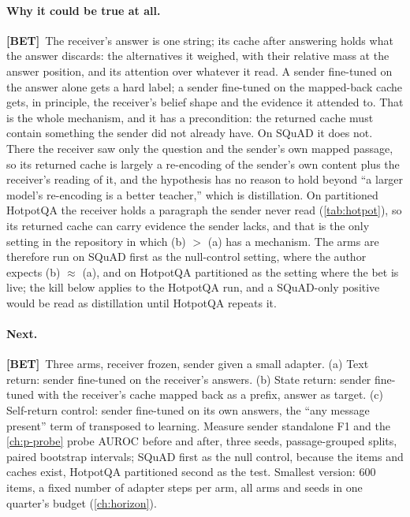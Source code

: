 \documentclass[11pt,a4paper]{report}
\newcommand{\BET}{\textcolor{betc}{\textbf{\scriptsize[BET]}}}
\begin{document}
\paragraph{Why it could be true at all.} \BET\ The receiver's answer is one string; its cache after answering holds what the answer discards: the alternatives it weighed, with their relative mass at the answer position, and its attention over whatever it read. A sender fine-tuned on the answer alone gets a hard label; a sender fine-tuned on the mapped-back cache gets, in principle, the receiver's belief shape and the evidence it attended to. That is the whole mechanism, and it has a precondition: the returned cache must contain something the sender did not already have. On SQuAD it does not. There the receiver saw only the question and the sender's own mapped passage, so its returned cache is largely a re-encoding of the sender's own content plus the receiver's reading of it, and the hypothesis has no reason to hold beyond ``a larger model's re-encoding is a better teacher,'' which is distillation. On partitioned HotpotQA the receiver holds a paragraph the sender never read (\cref{tab:hotpot}), so its returned cache can carry evidence the sender lacks, and that is the only setting in the repository in which (b) $>$ (a) has a mechanism. The arms are therefore run on SQuAD first as the null-control setting, where the author expects (b) $\approx$ (a), and on HotpotQA partitioned as the setting where the bet is live; the kill below applies to the HotpotQA run, and a SQuAD-only positive would be read as distillation until HotpotQA repeats it.

\paragraph{Next.} \BET\ Three arms, receiver frozen, sender given a small adapter. (a) Text return: sender fine-tuned on the receiver's answers. (b) State return: sender fine-tuned with the receiver's cache mapped back as a prefix, answer as target. (c) Self-return control: sender fine-tuned on its own answers, the ``any message present'' term of \citet{2607.26773} transposed to learning. Measure sender standalone F1 and the \cref{ch:p-probe} probe AUROC before and after, three seeds, passage-grouped splits, paired bootstrap intervals; SQuAD first as the null control, because the items and caches exist, HotpotQA partitioned second as the test. Smallest version: 600 items, a fixed number of adapter steps per arm, all arms and seeds in one quarter's budget (\cref{ch:horizon}).
\end{document}

